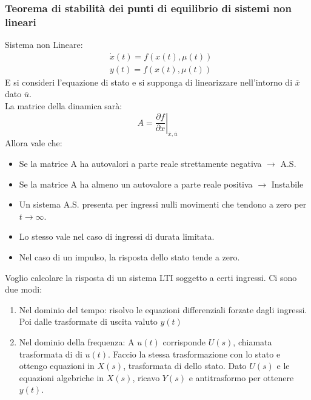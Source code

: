 	\subsubsection{Teorema di stabilità dei punti di equilibrio di sistemi non lineari}
	Sistema non Lineare:
	\begin{equation*}
		\begin{aligned}
			& \dot{x}(t)=f(x(t), \mu(t)) \\
			& y(t)=f(x(t), \mu(t))
		\end{aligned}
	\end{equation*}
	E si consideri l'equazione di stato e si supponga di linearizzare nell'intorno di $\overline{x}$ dato $\overline{u}$.\\
	La matrice della dinamica sarà:
	\begin{equation*}
		A=\left.\frac{\partial f}{\partial x}\right|_{\bar{x}, \bar{u}}
	\end{equation*}
	Allora vale che:
	\begin{itemize}
		\item Se la matrice A ha autovalori a parte reale strettamente negativa $\to$ A.S.
		\item Se la matrice A ha almeno un autovalore a parte reale positiva $\to$ Instabile
	\end{itemize}
	\begin{itemize}
		\item Un sistema A.S. presenta per ingressi nulli movimenti che tendono a zero per $ t \to \infty $.
		\item Lo stesso vale nel caso di ingressi di durata limitata.
		\item Nel caso di un impulso, la risposta dello stato tende a zero.
	\end{itemize}
	Voglio calcolare la risposta di un sistema LTI soggetto a certi ingressi. Ci sono due modi:
	\begin{enumerate}
		\item Nel dominio del tempo: risolvo le equazioni differenziali forzate dagli ingressi. Poi dalle trasformate di uscita valuto $y(t)$
		\item Nel dominio della frequenza: A $u(t)$ corrisponde $U(s)$, chiamata trasformata di  di $ u(t) $. Faccio la stessa trasformazione con lo stato e ottengo equazioni in $ X(s) $,
		trasformata di  dello stato. Dato $ U(s) $ e le equazioni algebriche in $ X(s) $, ricavo $ Y(s) $ e antitrasformo per ottenere $ y(t) $.
	\end{enumerate}
